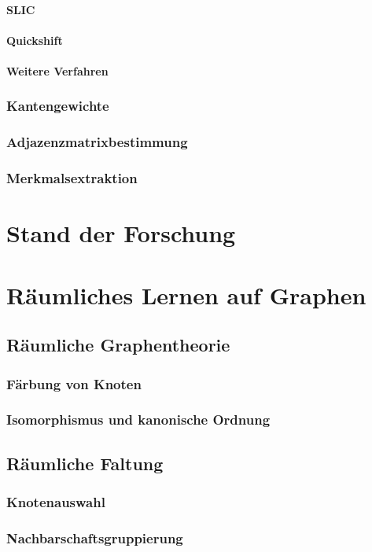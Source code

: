 \subsubsection{SLIC}
\subsubsection{Quickshift}
\subsubsection{Weitere Verfahren}
\subsection{Kantengewichte}
\subsection{Adjazenzmatrixbestimmung}
\subsection{Merkmalsextraktion}

\chapter{Stand der Forschung}

\chapter{Räumliches Lernen auf Graphen}
\section{Räumliche Graphentheorie}
\subsection{Färbung von Knoten}
\subsection{Isomorphismus und kanonische Ordnung}
\section{Räumliche Faltung}
\subsection{Knotenauswahl}
\subsection{Nachbarschaftsgruppierung}

